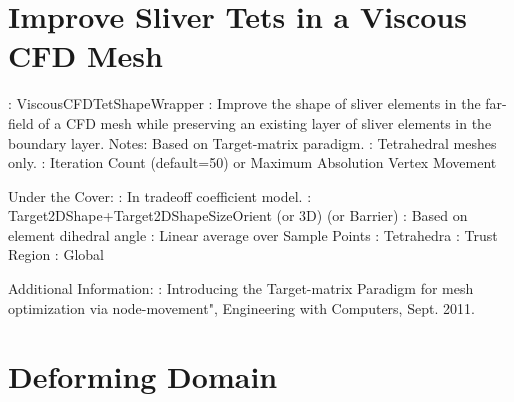 \newpage

\section{Improve Sliver Tets in a Viscous CFD Mesh} \label{sec:ViscousCFDTetShapeWrapper}

: ViscousCFDTetShapeWrapper \newline
{}: Improve the shape of sliver elements in the far-field 
of a CFD mesh while 
preserving an existing layer of sliver elements in the boundary layer. \newline
\noindent Notes: Based on Target-matrix paradigm.  \newline
{}: Tetrahedral meshes only.  \newline 
{}: Iteration Count (default=50) or Maximum Absolution Vertex Movement \newline \newline
 
\noindent Under the Cover: \newline
{}: In tradeoff coefficient model. \newline
{}: Target2DShape+Target2DShapeSizeOrient (or 3D) (or Barrier) \newline
{}: Based on element dihedral angle \newline
{}: Linear average over Sample Points \newline
{}: Tetrahedra \newline
{}: Trust Region \newline
{}: Global \newline


\noindent Additional Information: \newline
{}: Introducing the Target-matrix Paradigm for mesh optimization via node-movement", Engineering with Computers, Sept. 2011.\newline

\section{Deforming Domain} \label{sec:DeformingDomain}

